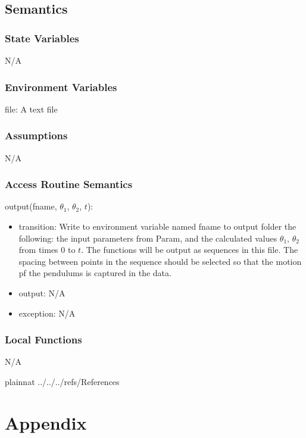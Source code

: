 \documentclass[12pt, titlepage]{article}
\begin{document}
\subsection{Semantics}

\subsubsection{State Variables}
N/A

\subsubsection{Environment Variables}

file: A text file
\subsubsection{Assumptions}

N/A
\subsubsection{Access Routine Semantics}

\noindent output(fname, $\theta_1$, $\theta_2$, $t$):
\begin{itemize}
\item transition:  Write to environment variable named fname to output folder the following: the input
    parameters from Param, and the calculated values $\theta_1$, $\theta_2$ from times $0$ to $t$.  The functions will be output as
    sequences in this file.  The spacing between points in the sequence should
    be selected so that the motion pf the pendulums is captured in the data.
\item output: N/A
\item exception: N/A
\end{itemize}

\subsubsection{Local Functions}

N/A
\newpage

 

 {plainnat}
 {../../../refs/References}

\newpage

\section{Appendix} \label{Appendix}
\renewcommand{\arraystretch}{1.2}
\end{document}
